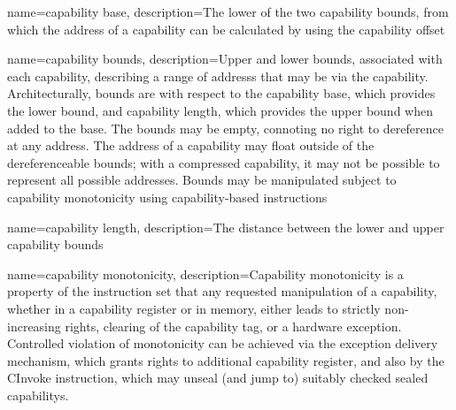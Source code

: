{
  name=capability base,
  description={The lower of the two \gls{capability bounds}, from which
    the \gls{address} of a \gls{capability} can be calculated by using
    the \gls{capability offset}}
}

{
  name=capability bounds,
  description={Upper and lower bounds, associated with each
    \gls{capability}, describing a range of \glspl{address} that may
    be  via the capability.
    Architecturally, bounds are with respect to the \gls{capability base},
    which provides the lower bound, and \gls{capability length}, which
    provides the upper bound when added to the base.
    The bounds may be empty, connoting no right to dereference at any
    address.
    The address of a capability may float outside of the
    dereferenceable bounds; with a \gls{compressed capability}, it may not
    be possible to represent all possible  addresses.
    Bounds may be manipulated subject to \gls{capability monotonicity}
    using \gls{capability-based instructions}}
}

{
  name=capability length,
  description={The distance between the lower and upper \gls{capability
    bounds}}
}

{
  name=capability monotonicity,
  description={Capability monotonicity is a property of the instruction set
    that any requested manipulation of a \gls{capability}, whether in a
    \gls{capability register} or in memory, either leads to strictly
    non-increasing rights, clearing of the \gls{capability tag}, or a
    hardware exception.    
    Controlled violation of monotonicity can be achieved via the exception
    delivery mechanism, which grants rights to additional capability
    register, and also by the \gls{CInvoke} instruction, which may
    unseal (and jump to) suitably checked \glspl{sealed
    capability}.
    }
}

